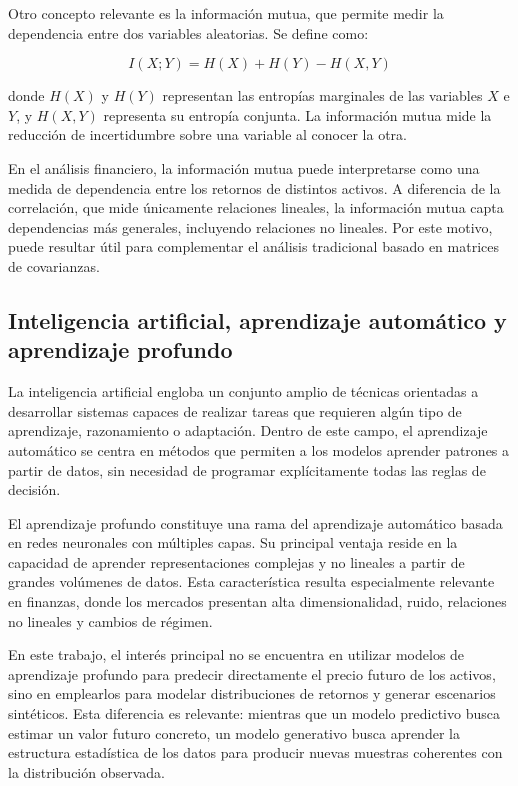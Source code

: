 Otro concepto relevante es la información mutua, que permite medir la dependencia entre dos variables aleatorias. Se define como:

\begin{equation}
I(X;Y) = H(X) + H(Y) - H(X,Y)
\end{equation}

donde $H(X)$ y $H(Y)$ representan las entropías marginales de las variables $X$ e $Y$, y $H(X,Y)$ representa su entropía conjunta. La información mutua mide la reducción de incertidumbre sobre una variable al conocer la otra.

En el análisis financiero, la información mutua puede interpretarse como una medida de dependencia entre los retornos de distintos activos. A diferencia de la correlación, que mide únicamente relaciones lineales, la información mutua capta dependencias más generales, incluyendo relaciones no lineales. Por este motivo, puede resultar útil para complementar el análisis tradicional basado en matrices de covarianzas.

\subsection{Inteligencia artificial, aprendizaje automático y aprendizaje profundo}

La inteligencia artificial engloba un conjunto amplio de técnicas orientadas a desarrollar sistemas capaces de realizar tareas que requieren algún tipo de aprendizaje, razonamiento o adaptación. Dentro de este campo, el aprendizaje automático se centra en métodos que permiten a los modelos aprender patrones a partir de datos, sin necesidad de programar explícitamente todas las reglas de decisión.

El aprendizaje profundo constituye una rama del aprendizaje automático basada en redes neuronales con múltiples capas. Su principal ventaja reside en la capacidad de aprender representaciones complejas y no lineales a partir de grandes volúmenes de datos. Esta característica resulta especialmente relevante en finanzas, donde los mercados presentan alta dimensionalidad, ruido, relaciones no lineales y cambios de régimen.

En este trabajo, el interés principal no se encuentra en utilizar modelos de aprendizaje profundo para predecir directamente el precio futuro de los activos, sino en emplearlos para modelar distribuciones de retornos y generar escenarios sintéticos. Esta diferencia es relevante: mientras que un modelo predictivo busca estimar un valor futuro concreto, un modelo generativo busca aprender la estructura estadística de los datos para producir nuevas muestras coherentes con la distribución observada.

